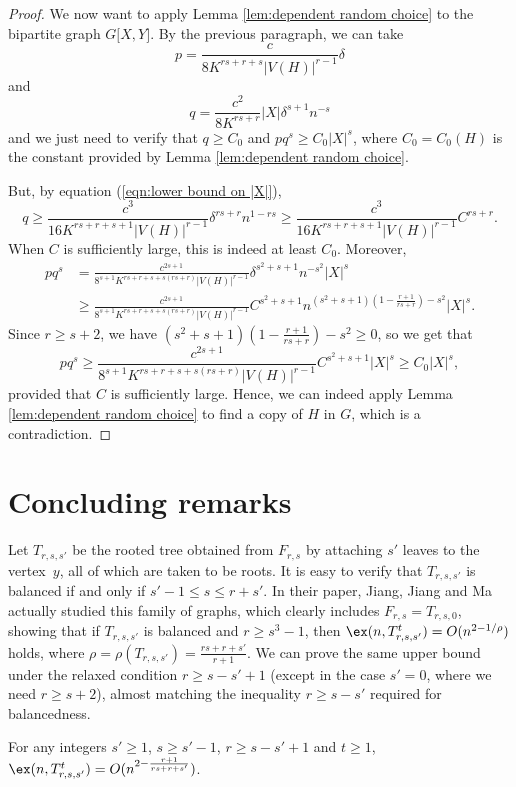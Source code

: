 \begin{proof}
	We now want to apply Lemma \ref{lem:dependent random choice} to the bipartite graph $G\lbrack X,Y\rbrack$. By the previous paragraph, we can take $$p=\frac{c}{8K^{rs+r+s}|V(H)|^{r-1}}\delta$$
	and
	$$q=\frac{c^2}{8K^{rs+r}}|X|\delta^{s+1}n^{-s}$$
	and we just need to verify that $q\geq C_0$ and $pq^s\geq C_0|X|^s$, where $C_0=C_0(H)$ is the constant provided by Lemma \ref{lem:dependent random choice}. 
	
	But, by equation (\ref{eqn:lower bound on |X|}),
	$$q\geq \frac{c^3}{16K^{rs+r+s+1}|V(H)|^{r-1}}\delta^{rs+r}n^{1-rs}\geq \frac{c^3}{16K^{rs+r+s+1}|V(H)|^{r-1}}C^{rs+r}.$$
	When $C$ is sufficiently large, this is indeed at least $C_0$.
	Moreover,
	\begin{align*}
		pq^s
		&= \frac{c^{2s+1}}{8^{s+1}K^{rs+r+s+s(rs+r)}|V(H)|^{r-1}}\delta^{s^2+s+1}n^{-s^2}|X|^s \\
		&\geq \frac{c^{2s+1}}{8^{s+1}K^{rs+r+s+s(rs+r)}|V(H)|^{r-1}}C^{s^2+s+1}n^{(s^2+s+1)(1-\frac{r+1}{rs+r})-s^2}|X|^s.
	\end{align*}
	Since $r\geq s+2$, we have $(s^2+s+1)(1-\frac{r+1}{rs+r})-s^2\geq 0$, so we get that
	$$pq^s\geq \frac{c^{2s+1}}{8^{s+1}K^{rs+r+s+s(rs+r)}|V(H)|^{r-1}}C^{s^2+s+1}|X|^s\geq C_0|X|^s,$$
	provided that $C$ is sufficiently large. Hence,  we can indeed apply Lemma \ref{lem:dependent random choice} to find a copy of $H$ in $G$, which is a contradiction.
\end{proof}

\section{Concluding remarks}

Let $T_{r,s, s'}$ be the rooted tree obtained from $F_{r,s}$ by attaching $s'$ leaves to the vertex~$y$, all of which are taken to be roots. It is easy to verify that $T_{r,s, s'}$ is balanced if and only if $s'-1\leq s\leq r+s'$. 
In their paper, Jiang, Jiang and Ma \cite{JJM20} actually studied this family of graphs, which clearly includes $F_{r,s} = T_{r,s,0}$, showing that if $T_{r,s, s'}$ is balanced and $r \geq s^3 - 1$, then $\ex(n,T_{r,s,s'}^t)=O(n^{2-1/\rho})$ holds, where $\rho=\rho(T_{r,s,s'}) = \frac{rs+r+s'}{r+1}$. We can prove the same upper bound under the relaxed condition $r\geq s-s'+1$ (except in the case $s'=0$, where we need $r\geq s+2$), almost matching the inequality $r\geq s-s'$ required for balancedness. 

\begin{theorem}
    For any integers $s'\geq 1$, $s\geq s'-1$, $r\geq s-s'+1$ and $t\geq 1$, $\ex(n,T_{r,s,s'}^t)=O(n^{2-\frac{r+1}{rs+r+s'}})$.
\end{theorem}

